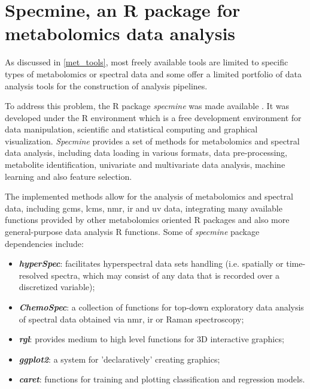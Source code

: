 
\section{Specmine, an R package for metabolomics data analysis} \label{specmine_chapter}

As discussed in \autoref{met_tools}, most freely available tools are limited to specific types of metabolomics or spectral data and some offer a limited portfolio of data analysis tools for the construction of analysis pipelines. 

To address this problem, the R package \textit{specmine} was made available \citep{costa2016r}. It was developed under the R environment which is a free development environment for data manipulation, scientific and statistical computing and graphical visualization. \textit{Specmine} provides a set of methods for metabolomics and spectral data analysis, including data loading in various formats, data pre-processing, metabolite identification, univariate and multivariate data analysis, machine learning and also feature selection. 

The implemented methods allow for the analysis of metabolomics and spectral data, including \gls{gcms}, \gls{lcms}, \gls{nmr}, \gls{ir} and \gls{uv} data, integrating many available functions provided by other metabolomics oriented R packages and also more general-purpose data analysis R functions. Some of \textit{specmine} package dependencies include:

\begin{itemize}[after = \vspace{-0.7cm}, before = \vspace{-0.7cm}]
	\item \textit{\textbf{hyperSpec}}: facilitates hyperspectral data sets handling (i.e. spatially or time-resolved spectra, which may consist of any data that is recorded over a discretized variable);
	\item \textit{\textbf{ChemoSpec}}: a collection of functions for top-down exploratory data analysis of spectral data obtained via \gls{nmr}, \gls{ir} or Raman spectroscopy;
	\item \textit{\textbf{rgl}}: provides medium to high level functions for 3D interactive graphics;
	\item \textit{\textbf{ggplot2}}: a system for 'declaratively' creating graphics;
	\item \textit{\textbf{caret}}: functions for training and plotting classification and regression models.
\end{itemize}


